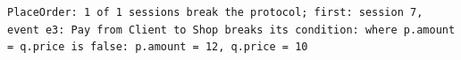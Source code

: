 \begin{lstlisting}[language={},basicstyle=\ttfamily\footnotesize,breaklines=true]
PlaceOrder: 1 of 1 sessions break the protocol; first: session 7, event e3: Pay from Client to Shop breaks its condition: where p.amount = q.price is false: p.amount = 12, q.price = 10
\end{lstlisting}
